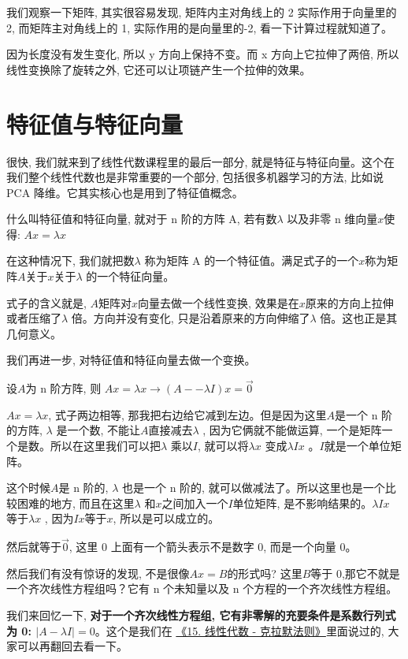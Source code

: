 我们观察一下矩阵, 其实很容易发现, 矩阵内主对角线上的 2 实际作用于向量里的 2,  而矩阵主对角线上的 1, 实际作用的是向量里的-2, 看一下计算过程就知道了。

因为长度没有发生变化, 所以 y 方向上保持不变。而 x 方向上它拉伸了两倍, 所以线性变换除了旋转之外, 它还可以让项链产生一个拉伸的效果。

\section{特征值与特征向量}

很快, 我们就来到了线性代数课程里的最后一部分, 就是特征与特征向量。这个在我们整个线性代数也是非常重要的一个部分, 包括很多机器学习的方法, 比如说 PCA 降维。它其实核心也是用到了特征值概念。

什么叫特征值和特征向量, 就对于 n 阶的方阵 A, 若有数$\lambda$ 以及非零 n 维向量$x$使得: $Ax = \lambda x$

在这种情况下, 我们就把数$\lambda$ 称为矩阵 A 的一个特征值。满足式子的一个$x$称为矩阵$A$关于$x$关于$\lambda$ 的一个特征向量。

式子的含义就是, $A$矩阵对$x$向量去做一个线性变换, 效果是在$x$原来的方向上拉伸或者压缩了$\lambda$ 倍。方向并没有变化, 只是沿着原来的方向伸缩了$\lambda$ 倍。这也正是其几何意义。

我们再进一步, 对特征值和特征向量去做一个变换。

设$A$为 n 阶方阵, 则 $Ax = \lambda x \to (A - \mbox{−} \lambda I)x = \vec 0$

$Ax = \lambda x$, 式子两边相等, 那我把右边给它减到左边。但是因为这里$A$是一个 n 阶的方阵, $\lambda$ 是一个数, 不能让$A$直接减去$\lambda$ , 因为它俩就不能做运算, 一个是矩阵一个是数。所以在这里我们可以把$\lambda$ 乘以$I$, 就可以将$\lambda x$ 变成$\lambda Ix$ 。$I$就是一个单位矩阵。

这个时候$A$是 n 阶的, $\lambda$ 也是一个 n 阶的, 就可以做减法了。所以这里也是一个比较困难的地方, 而且在这里$\lambda$ 和$x$之间加入一个$I$单位矩阵, 是不影响结果的。$\lambda Ix$ 等于$\lambda x$ , 因为$Ix$等于$x$, 所以是可以成立的。

然后就等于$\vec 0$,  这里 0 上面有一个箭头表示不是数字 0, 而是一个向量 0。

然后我们有没有惊讶的发现, 不是很像$Ax = B$的形式吗? 这里$B$等于 0,那它不就是一个齐次线性方程组吗？它有 n 个未知量以及 n 个方程的一个齐次线性方程组。

我们来回忆一下, \textbf{对于一个齐次线性方程组,  它有非零解的充要条件是系数行列式为 0: $|A - \lambda I| = 0$}。这个是我们在 \hyperlink{15.线性代数}{《15. 线性代数 - 克拉默法则》}里面说过的, 大家可以再翻回去看一下。

